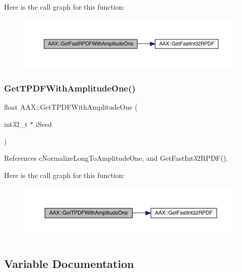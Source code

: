 Here is the call graph for this function\+:
\nopagebreak
\begin{figure}[H]
\begin{center}
\leavevmode
\includegraphics[width=350pt]{a00852_a145cc6d06cd682e2d234d07ce939760e_cgraph}
\end{center}
\end{figure}
\mbox{\label{a00852_a42cc414ea1b868e26c591041a66ad8af}} 
\subsubsection{\texorpdfstring{GetTPDFWithAmplitudeOne()}{GetTPDFWithAmplitudeOne()}}
{\footnotesize\ttfamily float A\+A\+X\+::\+Get\+T\+P\+D\+F\+With\+Amplitude\+One (\begin{DoxyParamCaption}\item[{int32\+\_\+t $\ast$}]{i\+Seed }\end{DoxyParamCaption})\hspace{0.3cm}{\ttfamily [inline]}}



References c\+Normalize\+Long\+To\+Amplitude\+One, and Get\+Fast\+Int32\+R\+P\+D\+F().

Here is the call graph for this function\+:
\nopagebreak
\begin{figure}[H]
\begin{center}
\leavevmode
\includegraphics[width=350pt]{a00852_a42cc414ea1b868e26c591041a66ad8af_cgraph}
\end{center}
\end{figure}


\subsection{Variable Documentation}
\mbox{\label{a00852_af4c24d9d2042fe4252db5431ef126d00}} 
